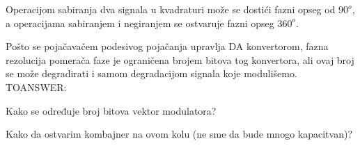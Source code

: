 \documentclass[journal,twocolumn,letterpaper]{IEEEJERM}
\begin{document}
Operacijom sabiranja dva signala u kvadraturi može se dostići fazni opseg od $90^o$, a operacijama sabiranjem i negiranjem se ostvaruje fazni opseg $360^o$.






Pošto se pojačavačem podesivog pojačanja upravlja DA konvertorom, fazna rezolucija pomerača faze je ograničena brojem bitova tog konvertora, ali ovaj broj se može degradirati i samom degradacijom signala koje modulišemo. \\

TOANSWER:

Kako se određuje broj bitova vektor modulatora?

Kako da ostvarim kombajner na ovom kolu (ne sme da bude mnogo kapacitvan)?\\


\end{document}
